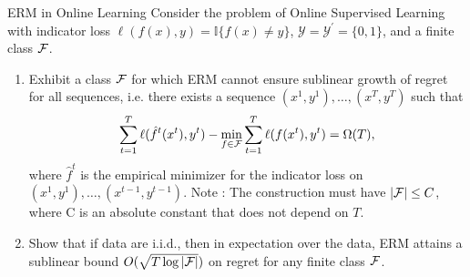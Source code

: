 \begin{exercise}[]{ERM in Online Learning}
Consider the problem of Online Supervised Learning with indicator loss $ \ell(f(x),y) = \mathbb{I}\{f(x)\neq y\} $, $
\mathcal{Y} = \mathcal{Y}^{\prime} = \{ 0,1 \} $, and a finite class $ \mathcal{F} $.
\begin{enumerate}

	\item Exhibit a class $ \mathcal{F} $ for which ERM cannot ensure sublinear growth of regret for all sequences, i.e.
		there exists a sequence $ (x^{1},y^{1}), \ldots, (x^{T},y^T) $ such that 
\begin{equation*}
	\sum_{t=1}^{T}\ell(\hat{f}^t(x^t),y^t) - \min_{f\in\mathcal{F}}\sum_{t=1}^T\ell(f(x^{t}),y^{t}) = \Omega(T),
\end{equation*}
where $ \hat{f}^t $ is the empirical minimizer for the indicator loss on $ (x^1,y^1),\ldots,(x^{t-1},y^{t-1}). $ Note :
The construction must have $ |\mathcal{F}| \leq C $, where C is an absolute constant that does not depend on $T$.

	\item Show that if data are i.i.d., then in expectation over the data, ERM attains a sublinear bound $
		O(\sqrt{T\log |\mathcal{F}|}) $ on regret for any finite class $ \mathcal{F} $.
\end{enumerate}
\end{exercise}

